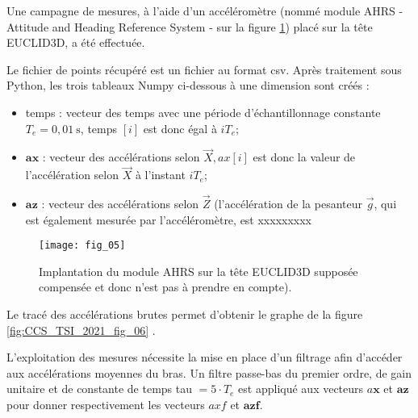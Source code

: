 Une campagne de mesures, à l'aide d'un accéléromètre (nommé module AHRS - Attitude and Heading Reference System - sur la figure \ref{fig:CCS_TSI_2021_fig_05}) placé sur la tête EUCLID3D, a été effectuée.

Le fichier de points récupéré est un fichier au format csv. Après traitement sous Python, les trois tableaux Numpy ci-dessous à une dimension sont créés :

\begin{itemize}
  \item temps : vecteur des temps avec une période d'échantillonnage constante $T_{e}=0,01 \mathrm{~s}$, temps $[i]$ est donc égal à $i T_{e}$;

  \item $\boldsymbol{a x}$ : vecteur des accélérations selon $\vec{X}, a x[i]$ est donc la valeur de l'accélération selon $\vec{X}$ à l'instant $i T_{e}$;

  \item $\boldsymbol{a} \boldsymbol{z}$ : vecteur des accélérations selon $\vec{Z}$ (l'accélération de la pesanteur $\vec{g}$, qui est également mesurée par l'accéléromètre, est xxxxxxxxx

\end{itemize}

\begin{figure}
\centering
\texttt{[image: fig\_05]}
\caption{\label{fig:CCS_TSI_2021_fig_05}Implantation du module AHRS sur la tête EUCLID3D supposée compensée et donc n'est pas à prendre en compte).}
\end{figure}

Le tracé des accélérations brutes permet d'obtenir le graphe de la figure \ref{fig:CCS_TSI_2021_fig_06} .

L'exploitation des mesures nécessite la mise en place d'un filtrage afin d'accéder aux accélérations moyennes du bras. Un filtre passe-bas du premier ordre, de gain unitaire et de constante de temps tau $=5 \cdot T_{e}$ est appliqué aux vecteurs $a \boldsymbol{x}$ et $\boldsymbol{a} \boldsymbol{z}$ pour donner respectivement les vecteurs $a x f$ et $\boldsymbol{a} \boldsymbol{z f}$.



